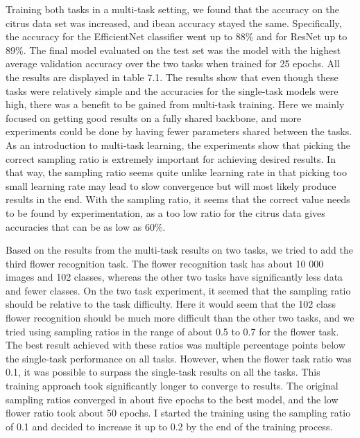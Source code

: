 Training both tasks in a multi-task setting, we found that the accuracy on the citrus data set was increased, and ibean accuracy stayed the same.
Specifically, the accuracy for the EfficientNet classifier went up to 88\% and for ResNet up to 89\%.
The final model evaluated on the test set was the model with the highest average validation accuracy over the two tasks when trained for 25 epochs.
All the results are displayed in table 7.1.
The results show that even though these tasks were relatively simple and the accuracies for the single-task models were high, there was a benefit to be gained from multi-task training.
Here we mainly focused on getting good results on a fully shared backbone, and more experiments could be done by having fewer parameters shared between the tasks.
As an introduction to multi-task learning, the experiments show that picking the correct sampling ratio is extremely important for achieving desired results.
In that way, the sampling ratio seems quite unlike learning rate in that picking too small learning rate may lead to slow convergence but will most likely produce results in the end.
With the sampling ratio, it seems that the correct value needs to be found by experimentation, as a too low ratio for the citrus data gives accuracies that can be as low as 60\%.

Based on the results from the multi-task results on two tasks, we tried to add the third flower recognition task.
The flower recognition task has about 10 000 images and 102 classes, whereas the other two tasks have significantly less data and fewer classes.
On the two task experiment, it seemed that the sampling ratio should be relative to the task difficulty.
Here it would seem that the 102 class flower recognition should be much more difficult than the other two tasks, and we tried using sampling ratios in the range of about 0.5 to 0.7 for the flower task.
The best result achieved with these ratios was multiple percentage points below the single-task performance on all tasks.
However, when the flower task ratio was 0.1, it was possible to surpass the single-task results on all the tasks.
This training approach took significantly longer to converge to results.
The original sampling ratios converged in about five epochs to the best model, and the low flower ratio took about 50 epochs.
I started the training using the sampling ratio of 0.1 and decided to increase it up to 0.2 by the end of the training process.

